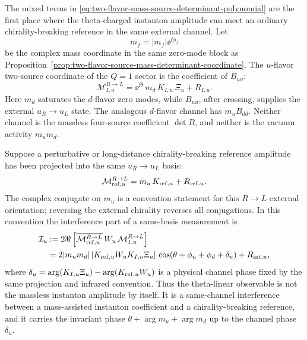 \begin{controlledapproximation}
\label{ca:instanton-mass-assisted-interference-channel}
The mixed terms in
\eqref{eq:two-flavor-mass-source-determinant-polynomial} are the first place
where the theta-charged instanton amplitude can meet an ordinary
chirality-breaking reference in the same external channel.  Let
\[
  m_f=|m_f|\ee^{\ii\phi_f}
\]
be the complex mass coordinate in the same zero-mode block as
Proposition~\ref{prop:two-flavor-source-mass-determinant-coordinate}.  The
\(u\)-flavor two-source coordinate of the \(Q=1\) sector is the coefficient of
\(B_{uu}\):
\begin{equation}
  \mathcal M_{I,u}^{R\to L}
  =
  \ee^{\ii\theta}\,
  m_d\,K_{I,u}\,\Xi_u
  +R_{I,u}.
  \label{eq:instanton-mass-assisted-u-channel}
\end{equation}
Here \(m_d\) saturates the \(d\)-flavor zero modes, while \(B_{uu}\), after
crossing, supplies the external \(u_R\to u_L\) state.  The analogous
\(d\)-flavor channel has \(m_uB_{dd}\).  Neither channel is the massless
four-source coefficient \(\det B\), and neither is the vacuum activity
\(m_um_d\).

Suppose a perturbative or long-distance chirality-breaking reference amplitude
has been projected into the same \(u_R\to u_L\) basis:
\begin{equation}
  \mathcal M_{{\rm ref},u}^{R\to L}
  =
  \bar m_u\,K_{{\rm ref},u}
  +R_{{\rm ref},u}.
  \label{eq:instanton-mass-assisted-reference}
\end{equation}
The complex conjugate on \(m_u\) is a convention statement for this
\(R\to L\) external orientation; reversing the external chirality reverses all
conjugations.  In this convention the interference part of a same-basis
measurement is
\begin{equation}
\begin{aligned}
  \mathcal I_u
  &:=
  2\Re\left[
    \overline{\mathcal M_{{\rm ref},u}^{R\to L}}\,
    W_u\,
    \mathcal M_{I,u}^{R\to L}
  \right]                                                \\
  &=
  2|m_um_d|\,
  |K_{{\rm ref},u}W_uK_{I,u}\Xi_u|\,
  \cos\!\left(\theta+\phi_u+\phi_d+\delta_u\right)
  +R_{{\rm int},u},
  \label{eq:instanton-mass-assisted-interference}
\end{aligned}
\end{equation}
where \(\delta_u=\arg(K_{I,u}\Xi_u)-\arg(K_{{\rm ref},u}W_u)\) is a physical
channel phase fixed by the same projection and infrared convention.  Thus the
theta-linear observable is not the massless instanton amplitude by itself.  It
is a same-channel interference between a mass-assisted instanton coefficient
and a chirality-breaking reference, and it carries the invariant phase
\(\theta+\arg m_u+\arg m_d\) up to the channel phase \(\delta_u\).


\end{controlledapproximation}
